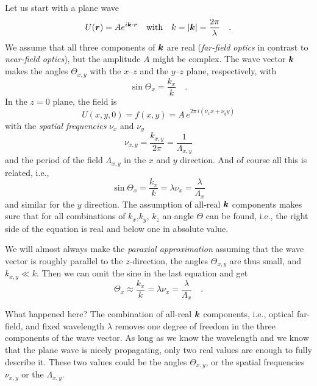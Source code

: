 Let us start with a plane wave
\begin{equation}
    U(\boldsymbol{r}) = A e^{i \boldsymbol{k} \cdot \boldsymbol{r}} \quad \text{with} \quad k = | \boldsymbol{k} | = \frac{2\pi}{\lambda} \quad .
\end{equation}
We assume that all three components of $\boldsymbol{k}$ are real (\emph{far-field optics} in contrast to \emph{near-field optics}), but the amplitude $A$ might be complex.
The wave vector $\boldsymbol{k}$ makes the angles $\Theta_{x,y}$ with the $x$--$z$ and the $y$--$z$ plane, respectively, with
\begin{equation}
    \sin \Theta_x = \frac{k_x}{k} \quad .
\end{equation}
In the $z=0$ plane, the field is
\begin{equation}
  U(x,y,0) = f(x,y) = A \, e^{2 \pi \, i (\nu_x x + \nu_y y) }
\end{equation}
with the \emph{spatial frequencies} $\nu_x$ and $\nu_y$ 
\begin{equation}
  \nu_{x,y} = \frac{k_{x,y}}{2 \pi} = \frac{1}{\Lambda_{x,y}}
\end{equation}
and the period of the field $\Lambda_{x,y}$ in the $x$ and $y$ direction. And of course all this is related, i.e.,
\begin{equation}
    \sin \Theta_x = \frac{k_x}{k} = \lambda \nu_x = \frac{\lambda}{\Lambda_x}
\end{equation}
and similar for the $y$ direction. The assumption of all-real $\boldsymbol{k}$ components makes sure that for all combinations of $k_x$,$k_y$, $k_z$ an angle $\Theta$ can be found, i.e., the right side of the equation is real and below one in absolute value. 

We will almost always make the \emph{paraxial approximation} assuming that the wave vector is roughly parallel to the $z$-direction, the angles $\Theta_{x,y}$ are thus small, and $k_{x,y} \ll k$. Then we can omit the sine in the last equation and get 
\begin{equation}
     \Theta_x \approx \frac{k_x}{k} = \lambda \nu_x = \frac{\lambda}{\Lambda_x} \quad .
\end{equation}

What happened here? The combination of all-real $\boldsymbol{k}$ components, i.e., optical far-field, and fixed wavelength $\lambda$ removes one degree of freedom in the three components of the wave vector. As long as we know the wavelength and we know that the plane wave is nicely propagating, only two  real values are enough to fully describe it. These two values could be the angles $\Theta_{x,y}$, or the spatial frequencies $\nu_{x,y}$ or the $\Lambda_{x,y}$.


